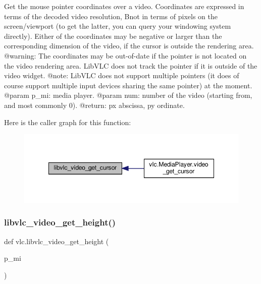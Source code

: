 \begin{DoxyVerb}Get the mouse pointer coordinates over a video.
Coordinates are expressed in terms of the decoded video resolution,
B{not} in terms of pixels on the screen/viewport (to get the latter,
you can query your windowing system directly).
Either of the coordinates may be negative or larger than the corresponding
dimension of the video, if the cursor is outside the rendering area.
@warning: The coordinates may be out-of-date if the pointer is not located
on the video rendering area. LibVLC does not track the pointer if it is
outside of the video widget.
@note: LibVLC does not support multiple pointers (it does of course support
multiple input devices sharing the same pointer) at the moment.
@param p_mi: media player.
@param num: number of the video (starting from, and most commonly 0).
@return: px abscissa, py ordinate.
\end{DoxyVerb}
 Here is the caller graph for this function\+:
\nopagebreak
\begin{figure}[H]
\begin{center}
\leavevmode
\includegraphics[width=348pt]{namespacevlc_a228937b07392d999417491489e90f7f0_icgraph}
\end{center}
\end{figure}
\mbox{\label{namespacevlc_a7c264d39e3dc764d025e7e8ae19017e9}} 
\subsubsection{\texorpdfstring{libvlc\+\_\+video\+\_\+get\+\_\+height()}{libvlc\_video\_get\_height()}}
{\footnotesize\ttfamily def vlc.\+libvlc\+\_\+video\+\_\+get\+\_\+height (\begin{DoxyParamCaption}\item[{}]{p\+\_\+mi }\end{DoxyParamCaption})}

